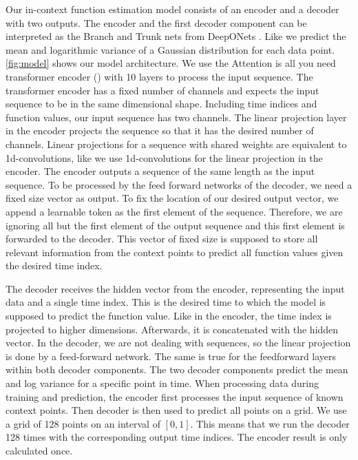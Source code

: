\label{sec:model}
Our in-context function estimation model consists of an encoder and a decoder with two outputs. The encoder and the first decoder component can be interpreted as the Branch and Trunk nets from DeepONets \citet{Lu_2021}. Like \citet{seifner2025zeroshotimputationfoundationinference} we predict the mean and logarithmic variance of a Gaussian distribution for each data point. \autoref{fig:model} shows our model architecture. We use the Attention is all you need transformer encoder (\citet{vaswani2017attention}) with 10 layers to process the input sequence. The transformer encoder has a fixed number of channels and expects the input sequence to be in the same dimensional shape. Including time indices and function values, our input sequence has two channels. The linear projection layer in the encoder projects the sequence so that it has the desired number of channels. Linear projections for a sequence with shared weights are equivalent to 1d-convolutions, like \citet{vaswani2017attention} we use 1d-convolutions for the linear projection in the encoder. The encoder outputs a sequence of the same length as the input sequence. To be processed by the feed forward networks of the decoder, we need a fixed size vector as output. To fix the location of our desired output vector, we append a learnable token as the first element of the sequence. Therefore, we are ignoring all but the first element of the output sequence and this first element is forwarded to the decoder. This vector of fixed size is supposed to store all relevant information from the context points to predict all function values given the desired time index.

The decoder receives the hidden vector from the encoder, representing the input data and a single time index. This is the desired time to which the model is supposed to predict the function value. Like in the encoder, the time index is projected to higher dimensions. Afterwards, it is concatenated with the hidden vector. In the decoder, we are not dealing with sequences, so the linear projection is done by a feed-forward network. The same is true for the feedforward layers within both decoder components. The two decoder components predict the mean and log variance for a specific point in time. When processing data during training and prediction, the encoder first processes the input sequence of known context points. Then decoder is then used to predict all points on a grid. We use a grid of 128 points on an interval of $[0,1]$. This means that we run the decoder 128 times with the corresponding output time indices. The encoder result is only calculated once. 

